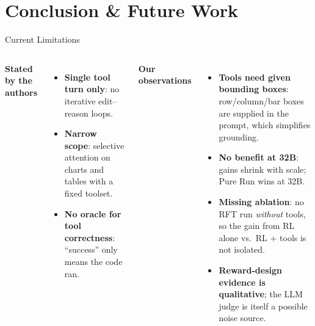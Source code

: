 \documentclass[aspectratio=169]{beamer}
\begin{document}
\section{Conclusion \& Future Work}

\begin{frame}{Current Limitations}
  \begin{columns}[T]
    \textbf{\textcolor{deepgold}{Stated by the authors}}
    \begin{itemize}
      \setlength{\itemsep}{0.3cm}
      \item \textbf{\textcolor{alertred}{Single tool turn only}}: no iterative edit--reason loops.
      \item \textbf{\textcolor{alertred}{Narrow scope}}: selective attention on charts and tables with a fixed toolset.
      \item \textbf{\textcolor{alertred}{No oracle for tool correctness}}: ``success'' only means the code ran.
    \end{itemize}
    \textbf{\textcolor{deepgold}{Our observations}}
    \begin{itemize}
      \setlength{\itemsep}{0.3cm}
      \item \textbf{\textcolor{alertred}{Tools need given bounding boxes}}: row/column/bar boxes are supplied in the prompt, which simplifies grounding.
      \item \textbf{\textcolor{alertred}{No benefit at 32B}}: gains shrink with scale; Pure Run wins at 32B.
      \item \textbf{\textcolor{alertred}{Missing ablation}}: no RFT run \emph{without} tools, so the gain from RL alone vs.\ RL + tools is not isolated.
      \item \textbf{\textcolor{alertred}{Reward-design evidence is qualitative}}; the LLM judge is itself a possible noise source.
    \end{itemize}
  \end{columns}
\end{frame}
\end{document}
